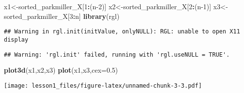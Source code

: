 \documentclass[
]{article}
\newenvironment{Shaded}{\begin{snugshade}}{\end{snugshade}}
\newcommand{\AttributeTok}[1]{\textcolor[rgb]{0.13,0.29,0.53}{#1}}
\newcommand{\DecValTok}[1]{\textcolor[rgb]{0.00,0.00,0.81}{#1}}
\newcommand{\FloatTok}[1]{\textcolor[rgb]{0.00,0.00,0.81}{#1}}
\newcommand{\FunctionTok}[1]{\textcolor[rgb]{0.13,0.29,0.53}{\textbf{#1}}}
\newcommand{\NormalTok}[1]{#1}
\newcommand{\OtherTok}[1]{\textcolor[rgb]{0.56,0.35,0.01}{#1}}
\newcommand{\SpecialCharTok}[1]{\textcolor[rgb]{0.81,0.36,0.00}{\textbf{#1}}}
\begin{document}
\begin{Shaded}
\begin{Highlighting}[]
\NormalTok{x1}\OtherTok{\textless{}{-}}\NormalTok{sorted\_parkmiller\_X[}\DecValTok{1}\SpecialCharTok{:}\NormalTok{(n}\DecValTok{{-}2}\NormalTok{)]}
\NormalTok{x2}\OtherTok{\textless{}{-}}\NormalTok{sorted\_parkmiller\_X[}\DecValTok{2}\SpecialCharTok{:}\NormalTok{(n}\DecValTok{{-}1}\NormalTok{)]}
\NormalTok{x3}\OtherTok{\textless{}{-}}\NormalTok{sorted\_parkmiller\_X[}\DecValTok{3}\SpecialCharTok{:}\NormalTok{n]}
\FunctionTok{library}\NormalTok{(rgl)}
\end{Highlighting}
\end{Shaded}

\begin{verbatim}
## Warning in rgl.init(initValue, onlyNULL): RGL: unable to open X11 display
\end{verbatim}

\begin{verbatim}
## Warning: 'rgl.init' failed, running with 'rgl.useNULL = TRUE'.
\end{verbatim}

\begin{Shaded}
\begin{Highlighting}[]
\FunctionTok{plot3d}\NormalTok{(x1,x2,x3)}
\FunctionTok{plot}\NormalTok{(x1,x3,}\AttributeTok{cex=}\FloatTok{0.5}\NormalTok{)}
\end{Highlighting}
\end{Shaded}

\texttt{[image: lesson1\_files/figure-latex/unnamed-chunk-3-3.pdf]}
\end{document}
